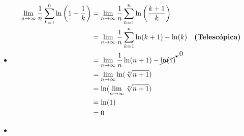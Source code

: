 \documentclass[12pt]{book}
\begin{document}
\begin{itemize}
    \item[\textbf{f)}] 

    \begin{align*}
        \lim_{n \to \infty} \frac{1}{n}\sum_{k=1}^n \ln\left(1+\frac{1}{k} \right)&= \lim_{n \to \infty} \frac{1}{n} \sum_{k=1}^n \ln\left(\frac{k+1}{k} \right) \\
        &= \lim_{n \to \infty} \frac{1}{n} \sum_{k=1}^n  \ln(k+1)-\ln(k) &&\textbf{(Telescópica)} \\
        &= \lim_{n \to \infty} \frac{1}{n}\ln(n+1)-\cancelto{0}{\ln(1)} \\
        &=\lim_{n \to \infty} \ln(\sqrt[n]{n+1}) \\
        &= \ln(\lim_{n \to \infty}\sqrt[n]{n+1}) \\
        &=\ln(1) \\
        &= 0
    \end{align*}


\item [\textbf{g)}]
\end{itemize} 
\end{document}
